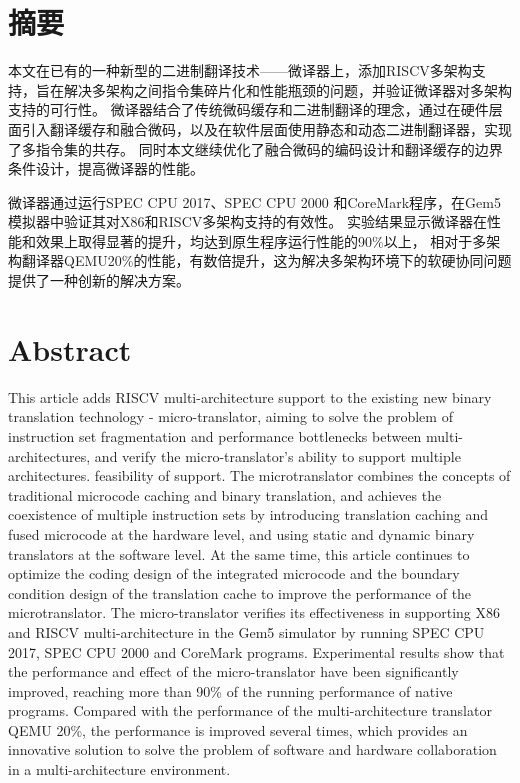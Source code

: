 \maketitle%
\MAKETITLE%
\makedeclaration%
\intobmk\chapter*{摘\quad 要}%
\setcounter{page}{1}%

本文在已有的一种新型的二进制翻译技术——微译器上，添加RISCV多架构支持，旨在解决多架构之间指令集碎片化和性能瓶颈的问题，并验证微译器对多架构支持的可行性。
微译器结合了传统微码缓存和二进制翻译的理念，通过在硬件层面引入翻译缓存和融合微码，以及在软件层面使用静态和动态二进制翻译器，实现了多指令集的共存。
同时本文继续优化了融合微码的编码设计和翻译缓存的边界条件设计，提高微译器的性能。

微译器通过运行SPEC CPU 2017、SPEC CPU 2000 和CoreMark程序，在Gem5模拟器中验证其对X86和RISCV多架构支持的有效性。
实验结果显示微译器在性能和效果上取得显著的提升，均达到原生程序运行性能的90\%以上，
相对于多架构翻译器QEMU20\%的性能，有数倍提升，这为解决多架构环境下的软硬协同问题提供了一种创新的解决方案。

\intobmk\chapter*{Abstract}%

This article adds RISCV multi-architecture support to the existing new binary translation technology - micro-translator, aiming to solve the problem of instruction set fragmentation and performance bottlenecks between multi-architectures, and verify the micro-translator's ability to support multiple architectures. feasibility of support.
The microtranslator combines the concepts of traditional microcode caching and binary translation, and achieves the coexistence of multiple instruction sets by introducing translation caching and fused microcode at the hardware level, and using static and dynamic binary translators at the software level.
At the same time, this article continues to optimize the coding design of the integrated microcode and the boundary condition design of the translation cache to improve the performance of the microtranslator.
The micro-translator verifies its effectiveness in supporting X86 and RISCV multi-architecture in the Gem5 simulator by running SPEC CPU 2017, SPEC CPU 2000 and CoreMark programs.
Experimental results show that the performance and effect of the micro-translator have been significantly improved, reaching more than 90\% of the running performance of native programs.
Compared with the performance of the multi-architecture translator QEMU 20\%, the performance is improved several times, which provides an innovative solution to solve the problem of software and hardware collaboration in a multi-architecture environment.


